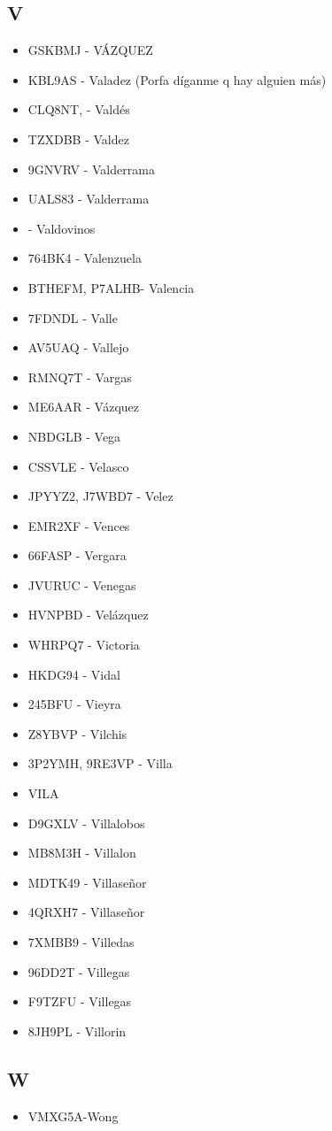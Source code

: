 \subsection*{V}
\begin{itemize}[leftmargin=*,nosep]
\item GSKBMJ - VÁZQUEZ
\item KBL9AS - Valadez (Porfa díganme q hay alguien más)
\item CLQ8NT,  - Valdés
\item TZXDBB  -  Valdez
\item 9GNVRV - Valderrama
\item UALS83   - Valderrama
\item - Valdovinos
\item 764BK4  -  Valenzuela
\item BTHEFM, P7ALHB- Valencia
\item 7FDNDL - Valle
\item AV5UAQ - Vallejo
\item RMNQ7T  -  Vargas
\item ME6AAR -  Vázquez
\item NBDGLB - Vega
\item CSSVLE - Velasco
\item JPYYZ2, J7WBD7 - Velez
\item EMR2XF - Vences
\item 66FASP  -  Vergara
\item JVURUC - Venegas
\item HVNPBD - Velázquez
\item WHRPQ7  -  Victoria
\item HKDG94  -  Vidal
\item 245BFU  -  Vieyra
\item Z8YBVP - Vilchis
\item 3P2YMH, 9RE3VP - Villa
\item VILA
\item D9GXLV  -  Villalobos
\item MB8M3H - Villalon
\item MDTK49  -  Villaseñor
\item 4QRXH7 - Villaseñor
\item 7XMBB9 - Villedas
\item 96DD2T  -  Villegas
\item F9TZFU  -  Villegas
\item 8JH9PL - Villorin
\end{itemize}

\subsection*{W}
\begin{itemize}[leftmargin=*,nosep]
\item VMXG5A-Wong
\end{itemize}

